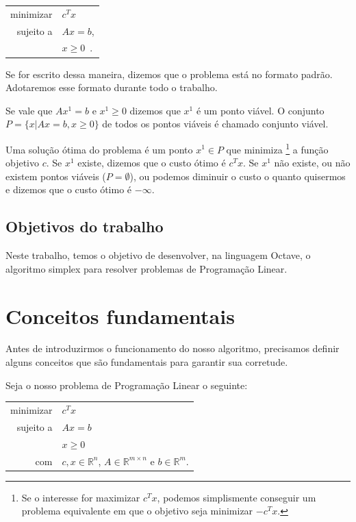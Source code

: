\documentclass[12pt]{article}
\begin{document}
	\begin{center}
    	\begin{tabular}{r l}
	  		minimizar & $c^Tx$ \\
        
	        sujeito a & $Ax = b$, \\
       				  & $x \geq 0$~\cite{315book}.
        \end{tabular}
    \end{center}
    Se for escrito dessa maneira, dizemos que o problema está no formato padrão. Adotaremos esse formato durante todo o trabalho.
    
    Se vale que $Ax^1 = b$ e $x^1 \geq 0$ dizemos que $x^1$ é um ponto viável. O conjunto $P = \{x| Ax = b, x \geq 0\}$ de todos os pontos viáveis é chamado conjunto viável.
    
    Uma solução ótima do problema é um ponto $x^1 \in P$ que minimiza \footnote[1]{Se o interesse for maximizar ${c}^{T}x$, podemos simplismente conseguir um problema equivalente em que o objetivo seja minimizar $-{c}^{T}x$.} a função objetivo $c$. Se $x^1$ existe, dizemos que o custo ótimo é $c^Tx$. Se $x^1$ não existe, ou não existem pontos viáveis ($P = \emptyset$), ou podemos diminuir o custo o quanto quisermos e dizemos que o custo ótimo é $- \infty$.
    

\subsection{Objetivos do trabalho}
	Neste trabalho, temos o objetivo de desenvolver, na linguagem Octave, o algoritmo simplex para resolver problemas de Programação Linear.


\section{Conceitos fundamentais}
	Antes de introduzirmos o funcionamento do nosso algoritmo, precisamos definir alguns conceitos que são fundamentais para garantir sua corretude.

	Seja o nosso problema de Programação Linear o seguinte:
    \begin{center}
    	\begin{tabular}{r l}
	  		minimizar & $c^Tx$ \\
        
        	sujeito a & $Ax = b$ \\
            & $x \geq 0$ \\
       	
        
        com & $c, x \in \mathbb{R}^n$, $A \in \mathbb{R}^{m \times n}$ e $b \in \mathbb{R}^{m}$.
        \end{tabular}
    \end{center}
\end{document}
